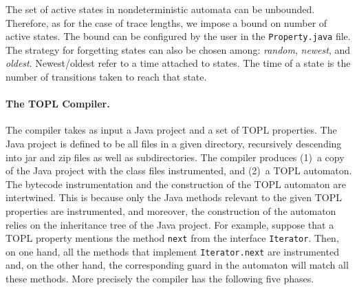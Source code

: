 \documentclass[9pt, preprint]{sigplanconf} %
\theoremstyle{definition}
\theoremstyle{remark}
\begin{document}
The set of active states in nondeterministic automata can be unbounded.
Therefore, as for the case of trace lengths, we impose a bound on number of active states. 
The bound can be configured by the user  in the {\tt Property.java}  file.  
The  strategy for forgetting states can also be chosen among: {\em random}, {\em newest}, and {\em oldest}.
Newest\slash oldest refer to a time attached to states.
The time  of a state is the number of transitions  taken to reach that state.


\paragraph{The TOPL Compiler.} \label{sec:toplc} %
The compiler takes as input a Java project and a set of TOPL properties.
The Java project is defined to be all files in a given directory, recursively descending into jar and zip files as well as  subdirectories.
The compiler produces (1)~a copy of the Java project with the class files instrumented, and (2)~a TOPL automaton.
The bytecode instrumentation and the construction of the TOPL automaton are intertwined.
This is because only the Java methods relevant to the given TOPL properties are instrumented, and moreover,
 the construction of the  automaton relies on the inheritance tree of the Java project.
For example, suppose that a TOPL property mentions the method {\tt next} from the interface {\tt Iterator}.
Then, on one hand, all the methods that implement {\tt Iterator.next} are instrumented and, on the other hand, the corresponding guard in the automaton will match all these methods.
%
More precisely the compiler has the following five phases.
\end{document}
